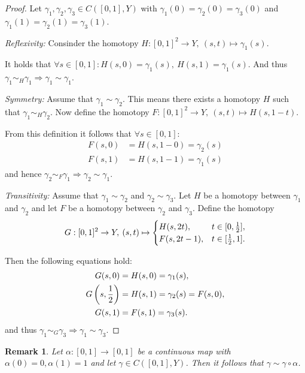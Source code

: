 \documentclass[a4paper, 11pt, twoside]{article}
\theoremstyle{break}
\theoremstyle{break}
\newtheorem{rem}[thm]{Remark}
\begin{document}
\begin{proof}
  Let $\gamma_1, \gamma_2, \gamma_3 \in C([0,1],Y)$ with $\gamma_1(0) = \gamma_2(0) = \gamma_3(0)$ and $\gamma_1(1) = \gamma_2(1) = \gamma_3(1)$.
  
  \textit{Reflexivity:}
  Consinder the homotopy $H: [0,1]^2 \to Y, \: (s, t) \mapsto \gamma_1(s)$. 
  
  It holds that $\forall s\in [0,1]: H(s, 0) = \gamma_1(s),\: H(s, 1) = \gamma_1(s)$. And thus $\gamma_1 \sim_H \gamma_1 \Rightarrow \gamma_1 \sim \gamma_1$.

  \textit{Symmetry:} 
  Assume that $\gamma_1 \sim \gamma_2$. This means there exists a homotopy $H$ such that $\gamma_1 \sim_H \gamma_2$. 
  Now define the homotopy $F: [0,1]^2 \to Y, \: (s, t) \mapsto H(s, 1-t)$. 
  
  From this definition it follows that $\forall s \in [0,1]:$
  \begin{align*}
    F(s, 0) &= H(s, 1 - 0) = \gamma_2(s) \\
    F(s, 1) &= H(s, 1 - 1) = \gamma_1(s)
  \end{align*}
  and hence $\gamma_2 \sim_F \gamma_1 \Rightarrow \gamma_2 \sim \gamma_1$.

  \textit{Transitivity:}
  Assume that $\gamma_1 \sim \gamma_2$ and $\gamma_2 \sim \gamma_3$. Let $H$ be a homotopy between $\gamma_1$ and $\gamma_2$ and let $F$ be a homotopy between $\gamma_2$ and $\gamma_3$. 
  Define the homotopy
  \begin{equation*} 
    G: [0,1]^2 \to Y, \: (s,t) \mapsto \begin{cases}
      H(s, 2t), &t \in [0, {1 \over 2}], \\
      F(s, 2t - 1), &t \in [{1 \over 2}, 1].
    \end{cases}
  \end{equation*}

  Then the following equations hold:
  \begin{align*}
    G(s,0) &= H(s,0) = \gamma_1(s), \\
    G\left(s,{1 \over 2}\right) &= H(s, 1) = \gamma_2(s) = F(s, 0), \\
    G(s, 1) &= F(s, 1) = \gamma_3(s).
  \end{align*}
  and thus $\gamma_1 \sim_G \gamma_3 \Rightarrow \gamma_1 \sim \gamma_3$.
\end{proof}

\begin{rem} \label{rem:reparam}
  Let $\alpha: [0,1] \to [0,1]$ be a continuous map with $\alpha(0) = 0, \alpha(1) = 1$ and let $\gamma \in C([0,1], Y)$. Then it follows that $\gamma \sim \gamma \circ \alpha$.
\end{rem}
\end{document}
